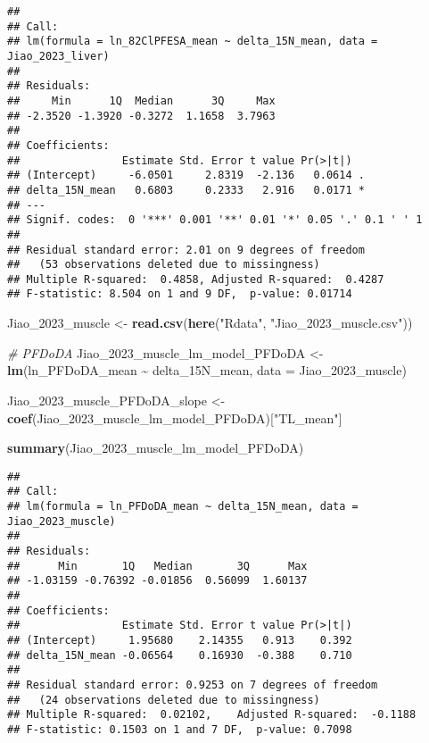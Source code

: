 \documentclass[
]{article}
\newenvironment{Shaded}{\begin{snugshade}}{\end{snugshade}}
\newcommand{\AttributeTok}[1]{\textcolor[rgb]{0.13,0.29,0.53}{#1}}
\newcommand{\CommentTok}[1]{\textcolor[rgb]{0.56,0.35,0.01}{\textit{#1}}}
\newcommand{\FunctionTok}[1]{\textcolor[rgb]{0.13,0.29,0.53}{\textbf{#1}}}
\newcommand{\NormalTok}[1]{#1}
\newcommand{\OtherTok}[1]{\textcolor[rgb]{0.56,0.35,0.01}{#1}}
\newcommand{\SpecialCharTok}[1]{\textcolor[rgb]{0.81,0.36,0.00}{\textbf{#1}}}
\newcommand{\StringTok}[1]{\textcolor[rgb]{0.31,0.60,0.02}{#1}}
\begin{document}
\begin{verbatim}
## 
## Call:
## lm(formula = ln_82ClPFESA_mean ~ delta_15N_mean, data = Jiao_2023_liver)
## 
## Residuals:
##     Min      1Q  Median      3Q     Max 
## -2.3520 -1.3920 -0.3272  1.1658  3.7963 
## 
## Coefficients:
##                Estimate Std. Error t value Pr(>|t|)  
## (Intercept)     -6.0501     2.8319  -2.136   0.0614 .
## delta_15N_mean   0.6803     0.2333   2.916   0.0171 *
## ---
## Signif. codes:  0 '***' 0.001 '**' 0.01 '*' 0.05 '.' 0.1 ' ' 1
## 
## Residual standard error: 2.01 on 9 degrees of freedom
##   (53 observations deleted due to missingness)
## Multiple R-squared:  0.4858, Adjusted R-squared:  0.4287 
## F-statistic: 8.504 on 1 and 9 DF,  p-value: 0.01714
\end{verbatim}

\begin{Shaded}
\begin{Highlighting}[]
\NormalTok{Jiao\_2023\_muscle }\OtherTok{\textless{}{-}} \FunctionTok{read.csv}\NormalTok{(}\FunctionTok{here}\NormalTok{(}\StringTok{"Rdata"}\NormalTok{, }\StringTok{"Jiao\_2023\_muscle.csv"}\NormalTok{))}

\CommentTok{\# PFDoDA}
\NormalTok{Jiao\_2023\_muscle\_lm\_model\_PFDoDA }\OtherTok{\textless{}{-}} \FunctionTok{lm}\NormalTok{(ln\_PFDoDA\_mean }\SpecialCharTok{\textasciitilde{}}\NormalTok{ delta\_15N\_mean,}
                                    \AttributeTok{data =}\NormalTok{ Jiao\_2023\_muscle)}

\NormalTok{Jiao\_2023\_muscle\_PFDoDA\_slope }\OtherTok{\textless{}{-}} \FunctionTok{coef}\NormalTok{(Jiao\_2023\_muscle\_lm\_model\_PFDoDA)[}\StringTok{"TL\_mean"}\NormalTok{]}

\FunctionTok{summary}\NormalTok{(Jiao\_2023\_muscle\_lm\_model\_PFDoDA)}
\end{Highlighting}
\end{Shaded}

\begin{verbatim}
## 
## Call:
## lm(formula = ln_PFDoDA_mean ~ delta_15N_mean, data = Jiao_2023_muscle)
## 
## Residuals:
##      Min       1Q   Median       3Q      Max 
## -1.03159 -0.76392 -0.01856  0.56099  1.60137 
## 
## Coefficients:
##                Estimate Std. Error t value Pr(>|t|)
## (Intercept)     1.95680    2.14355   0.913    0.392
## delta_15N_mean -0.06564    0.16930  -0.388    0.710
## 
## Residual standard error: 0.9253 on 7 degrees of freedom
##   (24 observations deleted due to missingness)
## Multiple R-squared:  0.02102,    Adjusted R-squared:  -0.1188 
## F-statistic: 0.1503 on 1 and 7 DF,  p-value: 0.7098
\end{verbatim}
\end{document}
